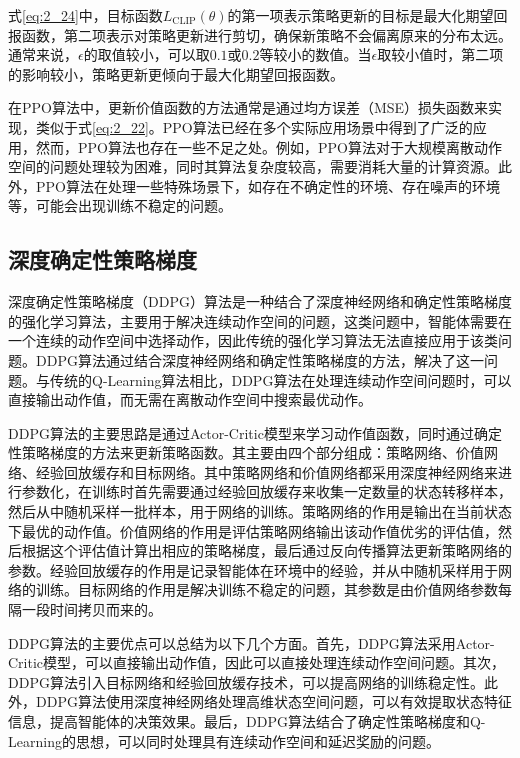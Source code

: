 式\ref{eq:2_24}中，目标函数$L_{\text{CLIP}}(\theta)$的第一项表示策略更新的目标是最大化期望回报函数，第二项表示对策略更新进行剪切，确保新策略不会偏离原来的分布太远。通常来说，$\epsilon$的取值较小，可以取$0.1$或$0.2$等较小的数值。当$\epsilon$取较小值时，第二项的影响较小，策略更新更倾向于最大化期望回报函数。

在PPO算法中，更新价值函数的方法通常是通过均方误差（MSE）损失函数来实现，类似于式\ref{eq:2_22}。PPO算法已经在多个实际应用场景中得到了广泛的应用，然而，PPO算法也存在一些不足之处。例如，PPO算法对于大规模离散动作空间的问题处理较为困难，同时其算法复杂度较高，需要消耗大量的计算资源。此外，PPO算法在处理一些特殊场景下，如存在不确定性的环境、存在噪声的环境等，可能会出现训练不稳定的问题。


\subsection{深度确定性策略梯度}

深度确定性策略梯度（DDPG）算法是一种结合了深度神经网络和确定性策略梯度的强化学习算法，主要用于解决连续动作空间的问题，这类问题中，智能体需要在一个连续的动作空间中选择动作，因此传统的强化学习算法无法直接应用于该类问题。DDPG算法通过结合深度神经网络和确定性策略梯度的方法，解决了这一问题。与传统的Q-Learning算法相比，DDPG算法在处理连续动作空间问题时，可以直接输出动作值，而无需在离散动作空间中搜索最优动作。

DDPG算法的主要思路是通过Actor-Critic模型来学习动作值函数，同时通过确定性策略梯度的方法来更新策略函数。其主要由四个部分组成：策略网络、价值网络、经验回放缓存和目标网络。其中策略网络和价值网络都采用深度神经网络来进行参数化，在训练时首先需要通过经验回放缓存来收集一定数量的状态转移样本，然后从中随机采样一批样本，用于网络的训练。策略网络的作用是输出在当前状态下最优的动作值。价值网络的作用是评估策略网络输出该动作值优劣的评估值，然后根据这个评估值计算出相应的策略梯度，最后通过反向传播算法更新策略网络的参数。经验回放缓存的作用是记录智能体在环境中的经验，并从中随机采样用于网络的训练。目标网络的作用是解决训练不稳定的问题，其参数是由价值网络参数每隔一段时间拷贝而来的。


DDPG算法的主要优点可以总结为以下几个方面。首先，DDPG算法采用Actor-Critic模型，可以直接输出动作值，因此可以直接处理连续动作空间问题。其次，DDPG算法引入目标网络和经验回放缓存技术，可以提高网络的训练稳定性。此外，DDPG算法使用深度神经网络处理高维状态空间问题，可以有效提取状态特征信息，提高智能体的决策效果。最后，DDPG算法结合了确定性策略梯度和Q-Learning的思想，可以同时处理具有连续动作空间和延迟奖励的问题。

